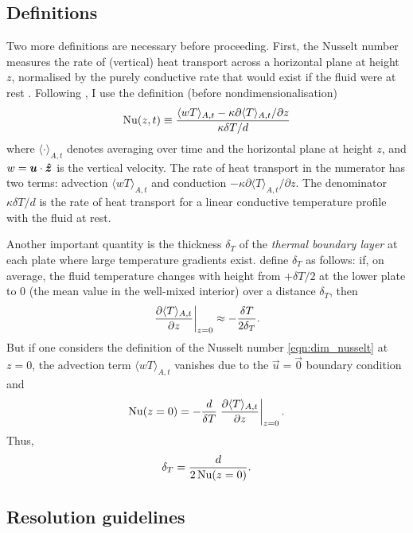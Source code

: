 \documentclass[../main.tex]{subfiles}
\begin{document}
\subsection{Definitions}
Two more definitions are necessary before proceeding. First, the Nusselt number
measures the rate of (vertical) heat transport across a horizontal plane at
height $z$, normalised by the purely conductive rate that would exist if the
fluid were at rest \parencite{verzicco1999}. Following \textcite{chilla2012}, I
use the definition (before nondimensionalisation)
\begin{equation}
    \label{eqn:dim_nusselt}
    \mathrm{Nu}(z,t) \equiv \frac{
        \langle wT \rangle_{A,t}
        - \kappa \partial \langle T \rangle_{A,t} / \partial z
    }{
        \kappa \delta T / d
    }
\end{equation}
where $\langle \cdot \rangle_{A,t}$ denotes averaging over time and the
horizontal plane at height $z$, and $w = \bm{u} \cdot \bm{\hat{z}}$ is the
vertical velocity. The rate of heat transport in the numerator has two terms:
advection $\langle wT \rangle_{A,t}$ and conduction $-\kappa \partial \langle T
\rangle_{A,t} / \partial z$. The denominator $\kappa \delta T / d$ is the rate
of heat transport for a linear conductive temperature profile with the fluid at
rest.

Another important quantity is the thickness $\delta_T$ of the \emph{thermal
boundary layer} at each plate where large temperature gradients exist.
\textcite{chilla2012} define $\delta_T$ as follows: if, on average, the fluid
temperature changes with height from $+\delta T/2$ at the lower plate to $0$
(the mean value in the well-mixed interior) over a distance $\delta_T$, then
\[
    \left. \frac{\partial \langle T \rangle_{A,t}}{\partial z} \right|_{z=0}
        \approx -\frac{\delta T}{2 \delta_T}.
\]
But if one considers the definition of the Nusselt number
\cref{eqn:dim_nusselt} at $z=0$, the advection term $\langle wT \rangle_{A,t}$
vanishes due to the $\vec{u} = \vec{0}$ boundary condition and
\[
    \mathrm{Nu}(z=0) = -\frac{d}{\delta T}
        \left. \frac{\partial \langle T \rangle_{A,t}}{\partial z} \right|_{z=0}.
\]
Thus,
\begin{equation}
    \label{eqn:thermal_bl}
    \delta_T = \frac{d}{2\,\mathrm{Nu}(z=0)}.
\end{equation}


\subsection{Resolution guidelines}
\label{sec:res_requirements}
\end{document}
